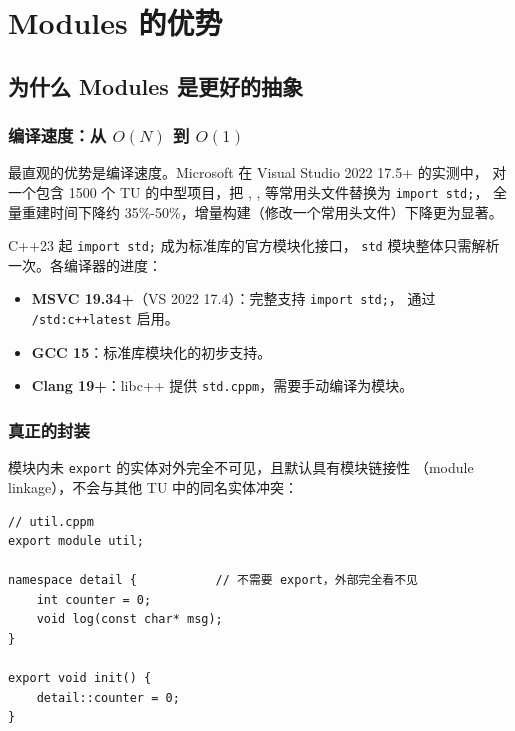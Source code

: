 \documentclass[12pt,a4paper,fontset=fandol]{ctexbook}
\newcommand{\cpplabel}{%
  \tcbox[on line,colback=cppheadbg,colframe=cppheadbg,
    boxrule=0pt,arc=1pt,left=2pt,right=2pt,top=1pt,bottom=1pt,
    colupper=white,fontupper=\scriptsize\bfseries]{C++}}
\newcommand{\flag}[1]{\texttt{#1}}
\begin{document}
\part{Modules 的优势}

\chapter{为什么 Modules 是更好的抽象}

\section{编译速度：从 $O(N)$ 到 $O(1)$}

最直观的优势是编译速度。Microsoft 在 Visual Studio 2022 17.5+ 的实测中，
对一个包含 1500 个 TU 的中型项目，把
,
,
等常用头文件替换为 \flag{import std;}，
全量重建时间下降约 35\%-50\%，增量构建（修改一个常用头文件）下降更为显著。

C++23 起 \flag{import std;} 成为标准库的官方模块化接口，
\texttt{std} 模块整体只需解析一次。各编译器的进度：

\begin{itemize}
  \item \textbf{MSVC 19.34+}（VS 2022 17.4）：完整支持 \flag{import std;}，
        通过 \flag{/std:c++latest} 启用。
  \item \textbf{GCC 15}：标准库模块化的初步支持。
  \item \textbf{Clang 19+}：libc++ 提供 \texttt{std.cppm}，需要手动编译为模块。
\end{itemize}

\section{真正的封装}

模块内未 \flag{export} 的实体对外完全不可见，且默认具有模块链接性
（module linkage），不会与其他 TU 中的同名实体冲突：

\cpplabel
\begin{lstlisting}[style=cppstyle]
// util.cppm
export module util;

namespace detail {           // 不需要 export，外部完全看不见
    int counter = 0;
    void log(const char* msg);
}

export void init() {
    detail::counter = 0;
}
\end{lstlisting}
\end{document}

